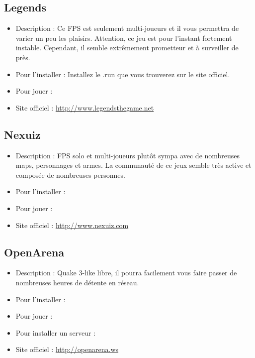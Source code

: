\subsection{Legends}
\begin{itemize}
\begingroup
{}
\item Description : Ce FPS est seulement multi-joueurs et il vous permettra de varier un peu les plaisirs. Attention, ce jeu est pour l'instant fortement instable. Cependant, il semble extrêmement prometteur et à surveiller de près.{\par}
\endgroup
\item Pour l'installer : Installez le .run que vous trouverez sur le site officiel.{\par}
\item Pour jouer : 
\item Site officiel : \url{http://www.legendsthegame.net}{\par}
\end{itemize}
\subsection{Nexuiz}
\begin{itemize}
\begingroup
{}
\item Description : FPS solo et multi-joueurs plutôt sympa avec de nombreuses maps, personnages et armes. La communauté de ce jeux semble  très active et composée de nombreuses personnes.{\par}
\item Pour l'installer : 
\item Pour jouer : 
\item Site officiel : \url{http://www.nexuiz.com}{\par}
\endgroup
\end{itemize}
\subsection{OpenArena}
\begin{itemize}
\begingroup
{}
\item Description : Quake 3-like libre, il pourra facilement vous faire passer de nombreuses heures de détente en réseau.\par
\item Pour l'installer : 
\item Pour jouer : 
\item Pour installer un serveur : 
\item Site officiel : \url{http://openarena.ws}{\par}
\endgroup
\end{itemize}
\newpage
